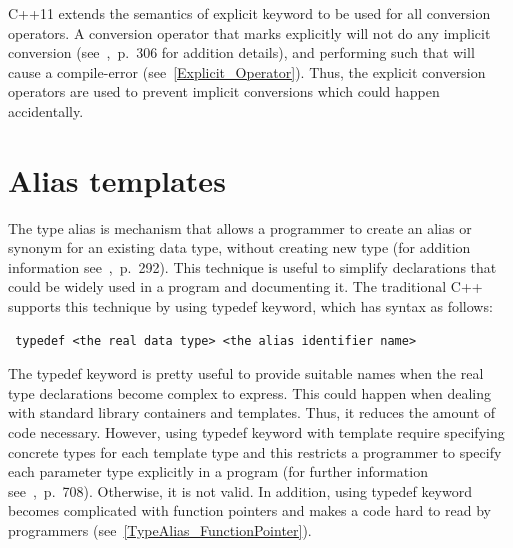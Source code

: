 \documentclass[11pt]{report}
\begin{document}
C++11 extends the semantics of explicit keyword to be used for all conversion operators. A conversion operator that marks explicitly will not do any implicit conversion (see~\cite{Stroustrup:2012:Cpp11},~p.~306 for addition details), and performing such that will cause a compile-error (see~\ref{Explicit_Operator}). Thus, the explicit conversion operators are used to prevent implicit conversions which could happen accidentally.

\section{Alias templates}
\label{section: Alias templates}
The type alias is mechanism that allows a programmer to create an alias or synonym for an existing data type, without creating new type (for addition information see~\cite{Gregorie:professionalcpp},~p.~292). This technique is useful to simplify declarations that could be widely used in a program and documenting it. The traditional C++ supports this technique by using typedef keyword, which has syntax as follows:
\begin{lstlisting}
 typedef <the real data type> <the alias identifier name>
\end{lstlisting}
The typedef keyword is pretty useful to provide suitable names when the real type declarations become complex to express. This could happen when dealing with standard library containers and templates. Thus, it reduces the amount of code necessary. However, using typedef keyword with template require specifying concrete types for each template type and this restricts a programmer to specify each parameter type explicitly in a program (for further information see~\cite{Gregorie:professionalcpp},~p.~708). Otherwise, it is not valid. In addition, using typedef keyword becomes complicated with function pointers and makes a code hard to read by programmers (see~\ref{TypeAlias_FunctionPointer}).
\end{document}
